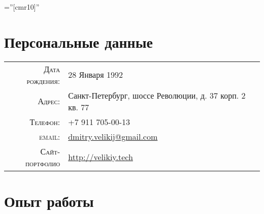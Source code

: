 \documentclass[a4paper,10pt]{article} %
\begin{document}
\pagestyle{empty} %

\font\fb=''[cmr10]'' %


\par{\bigskip\par} %

\section{Персональные данные}

\begin{tabular}{rl}
    \textsc{Дата рождения:} & 28 Января 1992 \\
    \textsc{Адрес:} &  Санкт-Петербург, шоссе Революции, д. 37 корп. 2 кв. 77 \\
    \textsc{Телефон:} & +7 911 705-00-13\\
    \textsc{email:} &
    \href{mailto:dmitry.velikij@gmail.com}{dmitry.velikij@gmail.com}\\
    \textsc{Сайт-портфолио} &
    \href{http://velikiy.tech}{http://velikiy.tech}
\end{tabular}


\section{Опыт работы}

\end{document}
